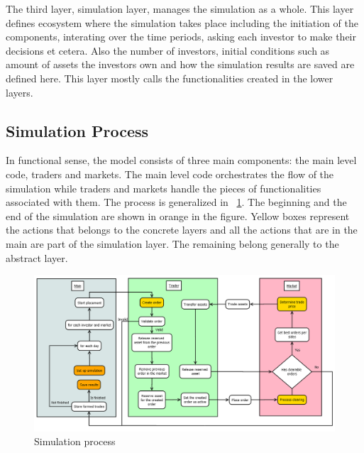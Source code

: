 The third layer, simulation layer, manages the simulation as a whole.
This layer defines ecosystem where the simulation takes place including
the initiation of the components, interating over the time periods, asking
each investor to make their decisions et cetera. Also the number of investors,
initial conditions such as amount of assets the investors own and how the 
simulation results are saved are defined here. This layer mostly calls
the functionalities created in the lower layers.



\subsection{Simulation Process}
In functional sense, the model consists of three main components:
the main level code, traders and markets. The main level code 
orchestrates the flow of the simulation while traders and markets
handle the pieces of functionalities associated with them. The process
is generalized in ~\ref{fig:sim_proc}. The beginning and the end of the 
simulation are shown in orange in the figure. Yellow boxes represent
the actions that belongs to the concrete layers and all the actions that
are in the main are part of the simulation layer. The remaining belong
generally to the abstract layer.


\begin{figure}
    \includegraphics[width=\linewidth]{diagrams/placement_clearing_process.png}
    \caption{Simulation process}
    \label{fig:sim_proc}
\end{figure}

